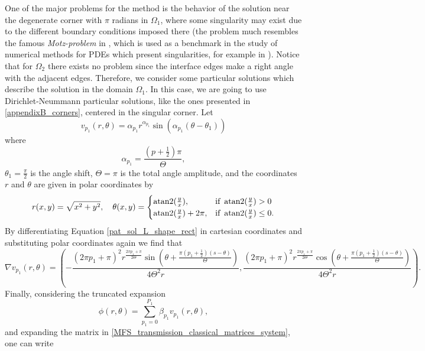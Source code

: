 One of the major problems for the method is the behavior of the solution near the degenerate corner with \(\pi\) radians in \(\Omega_1\), where some singularity may exist due to the different boundary conditions imposed there (the problem much resembles the famous \textit{Motz-problem} in \cite{motz1947treatment}, which is used as a benchmark in the study of numerical methods for \acp{PDE} which present singularities, for example in \cite{antunes2010meshfree}). Notice that for \(\Omega_2\) there exists no problem since the interface edges make a right angle with the adjacent edges. Therefore, we consider some particular solutions which describe the solution in the domain \(\Omega_1\). In this case, we are going to use Dirichlet-Neummann particular solutions, like the ones presented in \ref{appendixB_corners}, centered in the singular corner. Let
\begin{equation}\label{pat_sol_L_shape_rect}
    v_{p_1}(r, \theta) = \alpha_{p_1} r^{\alpha_{p_1}} \sin(\alpha_{p_1}(\theta - \theta_1))
\end{equation}
where
\[
    \alpha_{p_1} = \frac{(p+\frac{1}{2})\pi}{\Theta},
\]
\(\theta_1 = \frac{\pi}{2}\) is the angle shift, \(\Theta = \pi\) is the total angle amplitude,  and the coordinates \(r\) and \(\theta\) are given in polar coordinates by
\[
    r(x,y) = \sqrt{x^2+y^2}, \quad \theta(x,y)=\begin{cases}
        \operatorname{atan2}(\frac{y}{x}),& \text{if } \operatorname{atan2}(\frac{y}{x})>0\\
        \operatorname{atan2}(\frac{y}{x})+2\pi,& \text{if } \operatorname{atan2}(\frac{y}{x})\leq0.
    \end{cases}
\]
By differentiating Equation \eqref{pat_sol_L_shape_rect} in cartesian coordinates and substituting polar coordinates again we find that
\begin{equation*}
    \nabla v_{p_1}(r, \theta) = \left(-\frac{(2 \pi  {p_1}+\pi )^2 r^{\frac{2 \pi  {p_1}+\pi }{2 \Theta }} \sin \left(\theta +\frac{\pi  \left(p_1+\frac{1}{2}\right) (s-\theta )}{\Theta }\right)}{4 \Theta ^2 r},\frac{(2 \pi  p_1+\pi )^2 r^{\frac{2 \pi  p_1+\pi }{2 \Theta }} \cos \left(\theta +\frac{\pi  \left(p_1+\frac{1}{2}\right) (s-\theta )}{\Theta }\right)}{4 \Theta ^2 r}\right).
\end{equation*}
Finally, considering the truncated expansion
\begin{equation}\label{num_particular_L_shape_rect_equation}
    \phi(r,\theta)=\sum_{p_1=0}^{P_1} \beta_{p_1} v_{p_1}(r, \theta),
\end{equation}
and expanding the matrix in \eqref{MFS_transmission_classical_matrices_system}, one can write
